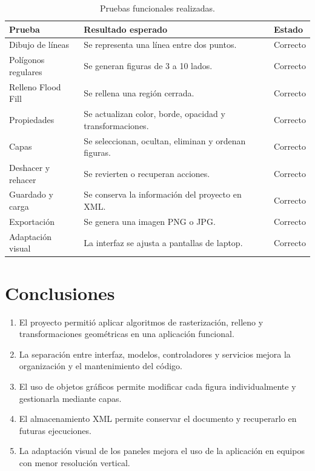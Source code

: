 \documentclass[11pt,a4paper]{report}
\begin{document}
\begin{table}[H]
\centering
\caption{Pruebas funcionales realizadas.}
\begin{tabular}{p{4cm} p{7cm} p{2cm}}
\toprule
\textbf{Prueba} & \textbf{Resultado esperado} & \textbf{Estado} \\
\midrule
Dibujo de líneas & Se representa una línea entre dos puntos. & Correcto \\
Polígonos regulares & Se generan figuras de 3 a 10 lados. & Correcto \\
Relleno Flood Fill & Se rellena una región cerrada. & Correcto \\
Propiedades & Se actualizan color, borde, opacidad y transformaciones. & Correcto \\
Capas & Se seleccionan, ocultan, eliminan y ordenan figuras. & Correcto \\
Deshacer y rehacer & Se revierten o recuperan acciones. & Correcto \\
Guardado y carga & Se conserva la información del proyecto en XML. & Correcto \\
Exportación & Se genera una imagen PNG o JPG. & Correcto \\
Adaptación visual & La interfaz se ajusta a pantallas de laptop. & Correcto \\
\bottomrule
\end{tabular}
\end{table}

\chapter{Conclusiones}

\begin{enumerate}
    \item El proyecto permitió aplicar algoritmos de rasterización, relleno y transformaciones geométricas en una aplicación funcional.
    \item La separación entre interfaz, modelos, controladores y servicios mejora la organización y el mantenimiento del código.
    \item El uso de objetos gráficos permite modificar cada figura individualmente y gestionarla mediante capas.
    \item El almacenamiento XML permite conservar el documento y recuperarlo en futuras ejecuciones.
    \item La adaptación visual de los paneles mejora el uso de la aplicación en equipos con menor resolución vertical.
\end{enumerate}
\end{document}
